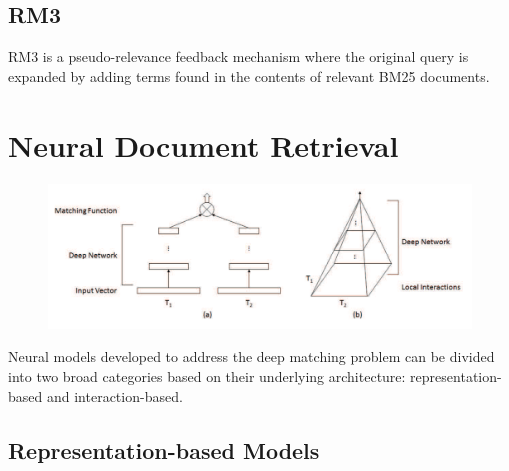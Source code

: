 \subsection{RM3}

RM3 is a pseudo-relevance feedback mechanism where the original query is expanded by adding terms found in the contents of relevant BM25 documents.


\section{Neural Document Retrieval}

\begin{figure}[t!]
\centering
  \includegraphics[width=6in]{deep_matching.png}
\caption{\cite{guo2017drmm}}
\label{fig:deep_matching}
\end{figure}

Neural models developed to address the deep matching problem can be divided into two broad categories based on their underlying architecture: representation-based and interaction-based.

\subsection{Representation-based Models}

